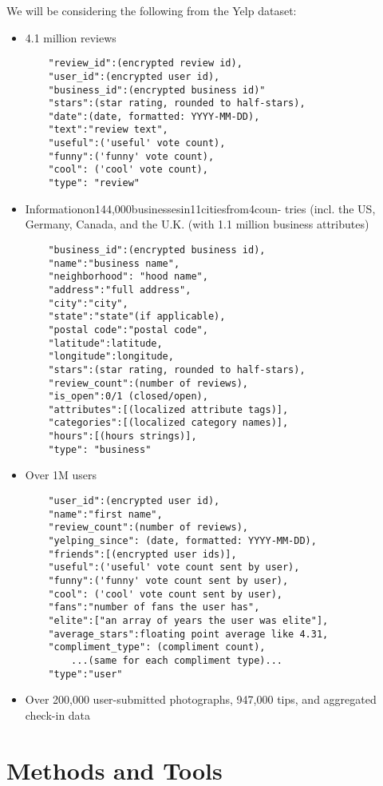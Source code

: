 \quad We will be considering the following from the Yelp dataset:

\begin{itemize}
	\item{4.1 million reviews}
	\begin{verbatim}
	"review_id":(encrypted review id),
	"user_id":(encrypted user id),
	"business_id":(encrypted business id)"
	"stars":(star rating, rounded to half-stars),
	"date":(date, formatted: YYYY-MM-DD),
	"text":"review text",
	"useful":('useful' vote count),
	"funny":('funny' vote count),
	"cool": ('cool' vote count),
	"type": "review"
	\end{verbatim}
	\item{Informationon144,000businessesin11citiesfrom4coun- tries (incl. the US, Germany, Canada, and the U.K. (with 1.1 million business attributes)}
	\begin{verbatim}
	"business_id":(encrypted business id),
	"name":"business name",
	"neighborhood": "hood name",
	"address":"full address",
	"city":"city",
	"state":"state"(if applicable),
	"postal code":"postal code",
	"latitude":latitude,
	"longitude":longitude,
	"stars":(star rating, rounded to half-stars),
	"review_count":(number of reviews),
	"is_open":0/1 (closed/open),
	"attributes":[(localized attribute tags)],
	"categories":[(localized category names)],
	"hours":[(hours strings)],
	"type": "business"
	\end{verbatim}
	\item{Over 1M users}
	\begin{verbatim}
	"user_id":(encrypted user id),
	"name":"first name",
	"review_count":(number of reviews),
	"yelping_since": (date, formatted: YYYY-MM-DD),
	"friends":[(encrypted user ids)],
	"useful":('useful' vote count sent by user),
	"funny":('funny' vote count sent by user),
	"cool": ('cool' vote count sent by user),
	"fans":"number of fans the user has",
	"elite":["an array of years the user was elite"],
	"average_stars":floating point average like 4.31,
	"compliment_type": (compliment count),
		...(same for each compliment type)...
	"type":"user"
	\end{verbatim}
	\item{Over 200,000 user-submitted photographs, 947,000 tips, and aggregated check-in data}
\end{itemize}

\section{Methods and Tools}

